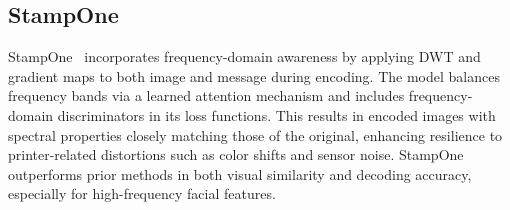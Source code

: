 \subsection{StampOne}
StampOne~\cite{shadmand2024stampone} incorporates frequency-domain awareness by applying \acs{DWT} and gradient maps to both image and message during encoding. The model balances frequency bands via a learned attention mechanism and includes frequency-domain discriminators in its loss functions. This results in encoded images with spectral properties closely matching those of the original, enhancing resilience to printer-related distortions such as color shifts and sensor noise. StampOne outperforms prior methods in both visual similarity and decoding accuracy, especially for high-frequency facial features.
